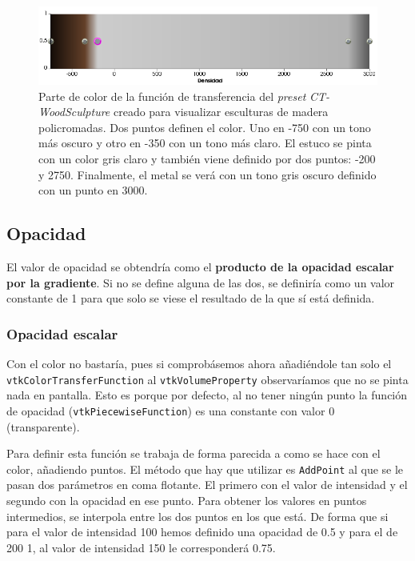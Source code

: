 \begin{figure}[H]
	\centering
	\includegraphics[width=12.5cm]{imagenes/color_tf}
	\caption{Parte de color de la función de transferencia del \textit{preset} \textit{CT-WoodSculpture} creado para visualizar esculturas de madera policromadas. Dos puntos definen el color. Uno en -750 con un tono más oscuro y otro en -350 con un tono más claro. El estuco se pinta con un color gris claro y también viene definido por dos puntos: -200 y 2750. Finalmente, el metal se verá con un tono gris oscuro definido con un punto en 3000.}
	\label{fig:color_tf}
\end{figure}

\subsection{Opacidad}

El valor de opacidad se obtendría como el \textbf{producto de la opacidad escalar por la gradiente}. Si no se define alguna de las dos, se definiría como un valor constante de 1 para que solo se viese el resultado de la que sí está definida.

\subsubsection{Opacidad escalar}

Con el color no bastaría, pues si comprobásemos ahora añadiéndole tan solo el \texttt{vtkColorTransferFunction} al \texttt{vtkVolumeProperty} observaríamos que no se pinta nada en pantalla. Esto es porque por defecto, al no tener ningún punto la función de opacidad (\texttt{vtkPiecewiseFunction}) es una constante con valor 0 (transparente). 

Para definir esta función se trabaja de forma parecida a como se hace con el color, añadiendo puntos. El método que hay que utilizar es \texttt{AddPoint} al que se le pasan dos parámetros en coma flotante. El primero con el valor de intensidad y el segundo con la opacidad en ese punto. Para obtener los valores en puntos intermedios, se interpola entre los dos puntos en los que está. De forma que si para el valor de intensidad 100 hemos definido una opacidad de 0.5 y para el de 200 1, al valor de intensidad 150 le corresponderá 0.75.

